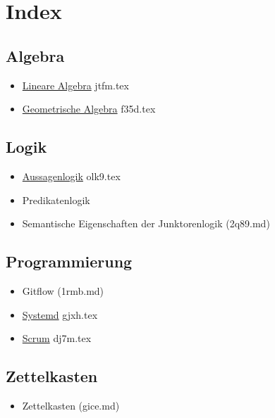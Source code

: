 \documentclass{sajzk}
\begin{document}
\section{Index}
\subsection{Algebra}

\begin{itemize}
    \item \href{jtfm.pdf}{Lineare Algebra} jtfm.tex
    \item \href{f35d.pdf}{Geometrische Algebra} f35d.tex
\end{itemize}

\subsection{Logik}

\begin{itemize}
    \item \href{olk9.pdf}{Aussagenlogik} olk9.tex 
    \item Predikatenlogik
    \item Semantische Eigenschaften der Junktorenlogik (2q89.md)
\end{itemize}

\subsection{Programmierung}

\begin{itemize}
    \item Gitflow (1rmb.md)
    \item \href{gjxh.pdf}{Systemd} gjxh.tex 
    \item \href{dj7m.pdf}{Scrum} dj7m.tex
\end{itemize}

\subsection{Zettelkasten}

\begin{itemize}
    \item Zettelkasten (gice.md)
\end{itemize}
\end{document}
